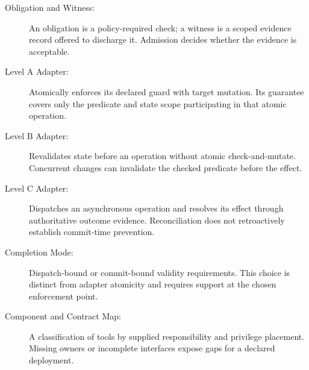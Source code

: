 \begin{description}
\item[Obligation and Witness:] An obligation is a policy-required check; a witness is a scoped evidence record offered to discharge it. Admission decides whether the evidence is acceptable.
\item[Level A Adapter:] Atomically enforces its declared guard with target mutation. Its guarantee covers only the predicate and state scope participating in that atomic operation.
\item[Level B Adapter:] Revalidates state before an operation without atomic check-and-mutate. Concurrent changes can invalidate the checked predicate before the effect.
\item[Level C Adapter:] Dispatches an asynchronous operation and resolves its effect through authoritative outcome evidence. Reconciliation does not retroactively establish commit-time prevention.
\item[Completion Mode:] Dispatch-bound or commit-bound validity requirements. This choice is distinct from adapter atomicity and requires support at the chosen enforcement point.
\item[Component and Contract Map:] A classification of tools by supplied responsibility and privilege placement. Missing owners or incomplete interfaces expose gaps for a declared deployment.
\end{description}
